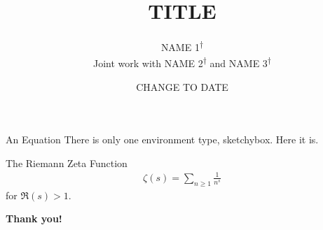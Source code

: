 \documentclass[12pt, c]{beamer}
\title{TITLE}
\author{\texorpdfstring{NAME 1\textsuperscript{$\dagger$} \\ 
\small Joint work with NAME 2\textsuperscript{$\dagger$} and NAME 3\textsuperscript{$\dagger$}}{}}
\institute{
\textsuperscript{$\dagger$}INSTITUTION \\
\vspace{0.5cm}
CONFERENCE}
\date{CHANGE TO DATE
    }
\begin{document}
{
\begin{frame}[plain] 
    \titlepage
\end{frame}
}



\begin{frame}{An Equation}
There is only one environment type, sketchybox. Here it is.
    \begin{sketchybox}{The Riemann Zeta Function}
    \begin{align*}
    \zeta(s) = \sum_{n\geq 1}\frac{1}{n^s} 
    \end{align*}
    for $ \Re(s)>1 $. 

\end{sketchybox}

\end{frame}



\begin{frame}
\center
\textbf{\textcolor{maintitletext}{Thank you!}}

\end{frame}
\end{document}
